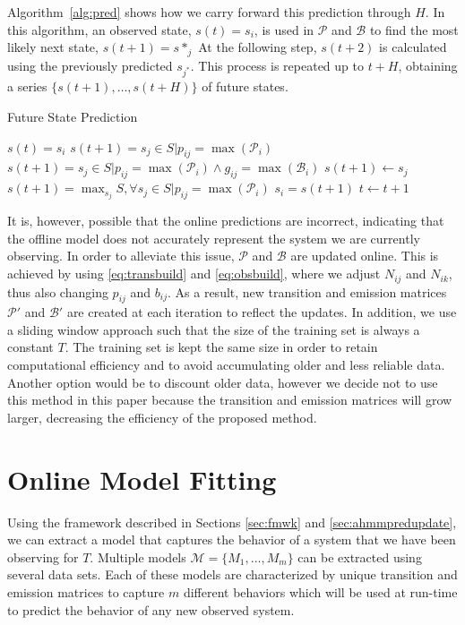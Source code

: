\documentclass[letterpaper, 10 pt, conference]{ieeeconf}  %
\newcommand\NB[1]{$\spadesuit$\footnote{NB: #1}}
\begin{document}
Algorithm~\ref{alg:pred} shows how we carry forward this prediction through $H$. In this algorithm, an observed state, $s(t) = s_i$, is used in %
$\mathcal P$ and $\mathcal B$ to find the most likely next state, $s(t+1) = s*_{j}$ %
At the following step, $s(t+2)$ is calculated using the previously predicted $s_{j^*}$. This process is repeated up to $t+H$, obtaining a series $\{s(t+1),\ldots,s(t+H)\}$ of future states.

\begin{algorithm}[ht!]
\caption{Future State Prediction} \label{alg:pred}
\begin{algorithmic}[1]
\STATE $s(t) = s_i$
\STATE $s(t+1) = s_j \in S \vert p_{ij}=\max(\mathcal{P}_i)$
\STATE $s(t+1)=s_j\in S\vert p_{ij}=\max(\mathcal{P}_i) \land g_{ij} = \max(\mathcal{B}_i)$
\STATE $s(t+1) \gets s_{j}$
\STATE $s(t+1) = \max_{s_j}S,\forall s_j\in S\vert p_{ij}=\max(\mathcal{P}_i)$
\ENDIF
\ENDIF
\STATE $s_i = s(t+1)$
\STATE $t \gets t+1$
\ENDWHILE
\end{algorithmic}
\end{algorithm}


It is, however, possible that the online predictions are incorrect, indicating that the offline model does not accurately represent the system we are currently observing. In order to alleviate this issue, $\mathcal{P}$ and $\mathcal{B}$ are updated online. This is achieved by using \eqref{eq:transbuild} and \eqref{eq:obsbuild}, where we adjust $N_{ij}$ and $N_{ik}$, thus also changing $p_{ij}$ and $b_{ij}$. As a result, new transition and emission matrices $\mathcal{P'}$ and $\mathcal{B'}$ are created at each iteration to reflect the updates. In addition, we use a sliding window approach such that the size of the training set is always a constant $T$. %
The training set is kept the same size in order to retain computational efficiency and to avoid accumulating older and less reliable data. Another option would be to discount older data, however we decide not to use this method in this paper because the transition and emission matrices will grow larger, decreasing the efficiency of the proposed method. 

\section{Online Model Fitting}\label{sec:omf}
Using the framework described in Sections \ref{sec:fmwk} and \ref{sec:ahmmpredupdate}, we can extract a model that captures the behavior of a system that we have been observing for $T$. Multiple models $\mathcal{M} = \{M_1,\ldots,M_m\}$ can be extracted using several data sets. Each of these models are characterized by unique transition and emission matrices to capture $m$ different behaviors which will be used at run-time to predict the behavior of any new observed system.
\end{document}
